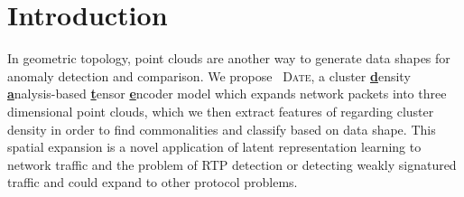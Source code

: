 \section{Introduction}

In geometric topology, point clouds are another way to generate data shapes for anomaly detection and comparison. We propose ~\textsc{Date}, a cluster \underline{\textbf{d}}ensity \underline{\textbf{a}}nalysis-based \underline{\textbf{t}}ensor \underline{\textbf{e}}ncoder model which expands network packets into three dimensional point clouds, which we then extract features of regarding cluster density in order to find commonalities and classify based on data shape. This spatial expansion is a novel application of latent representation learning to network traffic and the problem of RTP detection or detecting weakly signatured traffic and could expand to other protocol problems.
